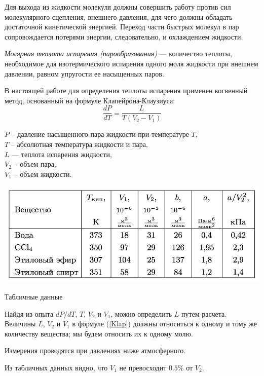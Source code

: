 \documentclass[a4paper,12pt]{article} %
\begin{document}
Для выхода из жидкости молекуля должны совершить работу против сил молекулярного сцепления, 
внешнего давления, для чего должны обладать достаточной кинетической энергией. Переход части 
быстрых молекул в пар сопровождается потерями энергии, следовательно, и охлаждением жидкости.

\textit{Молярная теплота испарения (парообразования)} — количество теплоты, необходимое для 
изотермического испарения одного моля жидкости при внешнем давлении, равном упругости ее насыщенных паров.
    
В настоящей работе для определения теплоты испарения применен косвенный метод, 
основанный на формуле Клапейрона-Клаузиуса:
\begin{equation}
    \label{Klap}
    \frac{dP}{dT} = \frac{L}{T(V_2 - V_1)}
\end{equation}

\noindent $P$ -- давление насыщенного пара жидкости при температуре $T$,\\ 
$T$ -- абсолютная температура жидкости и пара,\\ 
$L$ — теплота испарения жидкости,\\ 
$V_2$ -- объем пара,\\ 
$V_1$ -- объем жидкости.

\begin{table}[h]
  \centering
  \includegraphics[scale = 0.55]{table_data.png}
  \caption{Табличные данные}
  \label{fig:table_data}
\end{table}

Найдя из опыта $dP/dT$, $T$, $V_2$ и $V_1$, можно определить $L$ путем расчета. 
Величины $L$, $V_2$ и $V_1$ в формуле (\ref{Klap}) должны относиться к одному и 
тому же количеству вещества; мы будем относить их к одному молю.

Измерения проводятся при давлениях ниже атмосферного.

Из табличных данных видно, что $V_1$ не превосходит $0.5\%$ от $V_2$. 

\medskip
\end{document}
